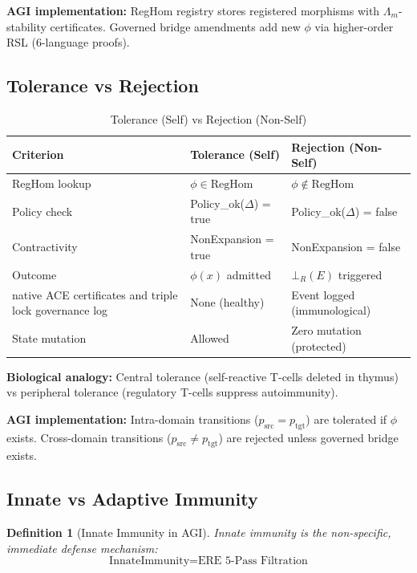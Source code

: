 \documentclass[11pt,a4paper]{article}
\newtheorem{definition}[theorem]{Definition}
\begin{document}
\textbf{AGI implementation:} RegHom registry stores registered morphisms with $\Lambda_m$-stability certificates. Governed bridge amendments add new $\phi$ via higher-order RSL (6-language proofs).

\subsection{Tolerance vs Rejection}

\begin{table}[h]
\centering
\caption{Tolerance (Self) vs Rejection (Non-Self)}
\label{tab:tolerance_rejection}
\begin{tabular}{@{}l l l@{}}
\toprule
\textbf{Criterion} & \textbf{Tolerance (Self)} & \textbf{Rejection (Non-Self)} \\
\midrule
RegHom lookup & $\phi \in \text{RegHom}$ & $\phi \notin \text{RegHom}$ \\
Policy check & Policy\_ok($\Delta$) = true & Policy\_ok($\Delta$) = false \\
Contractivity & NonExpansion = true & NonExpansion = false \\
Outcome & $\phi(x)$ admitted & $\bot_R(E)$ triggered \\
native ACE certificates and triple lock governance log & None (healthy) & Event logged (immunological) \\
State mutation & Allowed & Zero mutation (protected) \\
\bottomrule
\end{tabular}
\end{table}

\textbf{Biological analogy:} Central tolerance (self-reactive T-cells deleted in thymus) vs peripheral tolerance (regulatory T-cells suppress autoimmunity).

\textbf{AGI implementation:} Intra-domain transitions ($p_{\text{src}} = p_{\text{tgt}}$) are tolerated if $\phi$ exists. Cross-domain transitions ($p_{\text{src}} \neq p_{\text{tgt}}$) are rejected unless governed bridge exists.

\subsection{Innate vs Adaptive Immunity}

\begin{definition}[Innate Immunity in AGI]
Innate immunity is the non-specific, immediate defense mechanism:
\begin{equation}
\text{InnateImmunity} = \text{ERE 5-Pass Filtration}
\end{equation}
\end{definition}
\end{document}
